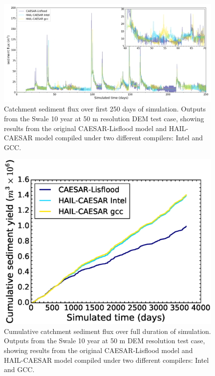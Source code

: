 \begin{figure}
\includegraphics[width=25cm]{chp05_figures_scripts/sed_tot_regression_alpha.png}
\caption{Catchment sediment flux over first 250 days of simulation. Outputs from the Swale 10 year at 50 m resolution DEM test case, showing results from the original CAESAR-Lisflood model and HAIL-CAESAR model compiled under two different compilers: Intel and GCC.}
\label{fig_swale_regression_sediment}
\end{figure}

\begin{figure}[t]
\includegraphics[width=15cm]{chp05_figures_scripts/cum_sed_tot_regression.eps}
\caption{Cumulative catchment sediment flux over full duration of simulation. Outputs from the Swale 10 year at 50 m DEM resolution test case, showing results from the original CAESAR-Lisflood model and HAIL-CAESAR model compiled under two different compilers: Intel and GCC.}
\label{fig_swale_regression_cum_sediment}
\end{figure}

